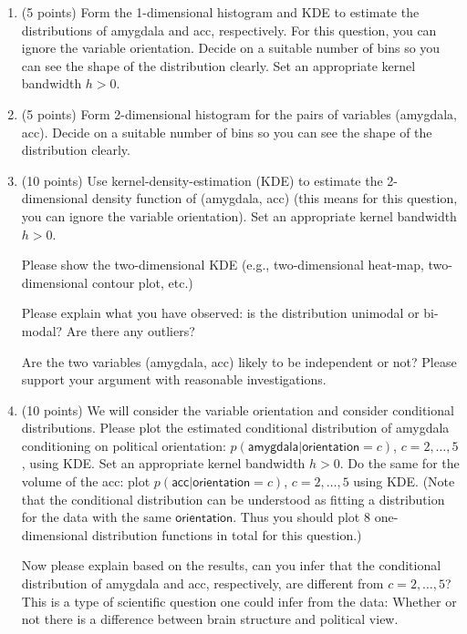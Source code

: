 \documentclass[12pt]{article}
\begin{document}
 \begin{enumerate}[label*=\arabic*.]
 
 
 \item (5 points) Form the 1-dimensional histogram and KDE to estimate the distributions of \textsf{amygdala} and \textsf{acc}, respectively. For this question, you can ignore the variable \textsf{orientation}. Decide on a suitable number of bins so you can see the shape of the distribution clearly. Set an appropriate kernel bandwidth $h >0$. 
 
 
 \item (5 points) Form 2-dimensional histogram for the pairs of variables (\textsf{amygdala}, \textsf{acc}). Decide on a suitable number of bins so you can see the shape of the distribution clearly. 
 
 \item (10 points) Use kernel-density-estimation (KDE) to estimate the 2-dimensional density function of (\textsf{amygdala}, \textsf{acc}) (this means for this question, you can ignore the variable \textsf{orientation}). Set an appropriate kernel bandwidth $h >0$. 

Please show the two-dimensional KDE (e.g., two-dimensional heat-map, two-dimensional contour plot, etc.)

Please explain what you have observed: is the distribution unimodal or bi-modal? Are there any outliers?

Are the two variables (\textsf{amygdala}, \textsf{acc}) likely to be independent or not? Please support your argument with reasonable investigations.


 \item (10 points) We will consider the variable \textsf{orientation} and consider conditional distributions. Please plot the estimated conditional distribution of \textsf{amygdala} conditioning on political \textsf{orientation}: $p(\textsf{amygdala}|\textsf{orientation}=c)$, $c = 2, \ldots, 5$, using KDE. Set an appropriate kernel bandwidth $h >0$.  Do the same for the volume of the \textsf{acc}: plot $p(\textsf{acc}|\textsf{orientation}=c)$, $c = 2, \ldots, 5$ using KDE. (Note that the conditional distribution can be understood as fitting a distribution for the data with the same $\textsf{orientation}$. Thus you should plot 8 one-dimensional distribution functions in total for this question.) 
 
 
Now please explain based on the results, can you infer that the conditional distribution of  \textsf{amygdala} and \textsf{acc}, respectively, are different from $c = 2, \ldots, 5$? This is a type of scientific question one could infer from the data: Whether or not there is a difference between brain structure and political view. 


\end{enumerate}
\end{document}
